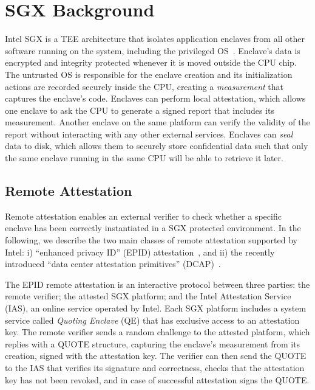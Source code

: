 \section{SGX Background}
\label{sec:background}

Intel SGX is a TEE architecture that isolates application enclaves from all other software running on the system, including the privileged OS~\cite{sgxexplained}. Enclave's data is encrypted and integrity protected whenever it is moved outside the CPU chip. The untrusted OS is responsible for the enclave creation and its initialization actions are recorded securely inside the CPU, creating a \emph{measurement} that captures the enclave's code. Enclaves can perform local attestation, which allows one enclave to ask the CPU to generate a signed report that includes its measurement. Another enclave on the same platform can verify the validity of the report without interacting with any other external services. Enclaves can \emph{seal} data to disk, which  allows them to securely store confidential data such  that only the same enclave running in the same CPU will be able to retrieve it later.


\subsection{Remote Attestation}
\label{sec:background:attestation}

Remote attestation enables an external verifier to check whether a specific enclave has been correctly instantiated in a SGX protected environment. In the following, we describe the two main classes of remote attestation supported by Intel: i) ``enhanced privacy ID'' (EPID) attestation~\cite{epid_attestation}, and ii) the recently introduced ``data center attestation primitives'' (DCAP)~\cite{DCAP}.

\parasaverL
{}
The EPID remote attestation is an interactive protocol between three parties: the remote verifier; the attested SGX platform; and the Intel Attestation Service (IAS), an online service operated by Intel. 
Each SGX platform includes a system service called \emph{Quoting Enclave} (QE) that has exclusive access to an attestation key. The remote verifier sends a random challenge to the attested platform, which replies with a QUOTE structure, capturing the enclave's measurement from its creation, signed with the attestation key. The verifier can then send the QUOTE to the IAS that verifies its signature and correctness, checks that the attestation key has not been revoked, and in case of successful attestation signs the QUOTE. 

